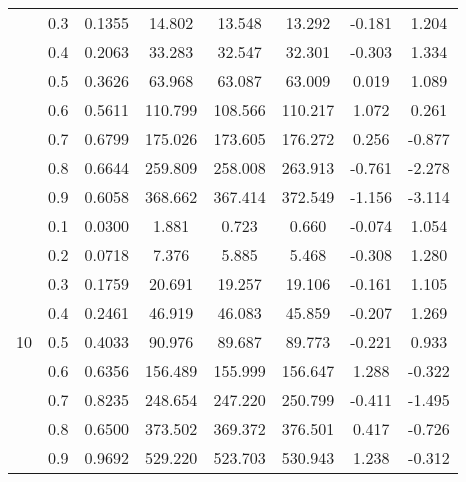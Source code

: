 \documentclass[11pt,a4paper]{report}
\begin{document}
\begin{longtable}{ | c | c || c | c | c | c | c | c | }
 & 0.3 & 0.1355 & 14.802 & 13.548 & 13.292 & -0.181 & 1.204 \\
 & 0.4 & 0.2063 & 33.283 & 32.547 & 32.301 & -0.303 & 1.334 \\
 & 0.5 & 0.3626 & 63.968 & 63.087 & 63.009 & 0.019 & 1.089 \\
 & 0.6 & 0.5611 & 110.799 & 108.566 & 110.217 & 1.072 & 0.261 \\
 & 0.7 & 0.6799 & 175.026 & 173.605 & 176.272 & 0.256 & -0.877 \\
 & 0.8 & 0.6644 & 259.809 & 258.008 & 263.913 & -0.761 & -2.278 \\
 & 0.9 & 0.6058 & 368.662 & 367.414 & 372.549 & -1.156 & -3.114 \\
 \hline
\multirow{9}{*}{10} & 0.1 & 0.0300 & 1.881 & 0.723 & 0.660 & -0.074 & 1.054 \\
 & 0.2 & 0.0718 & 7.376 & 5.885 & 5.468 & -0.308 & 1.280 \\
 & 0.3 & 0.1759 & 20.691 & 19.257 & 19.106 & -0.161 & 1.105 \\
 & 0.4 & 0.2461 & 46.919 & 46.083 & 45.859 & -0.207 & 1.269 \\
 & 0.5 & 0.4033 & 90.976 & 89.687 & 89.773 & -0.221 & 0.933 \\
 & 0.6 & 0.6356 & 156.489 & 155.999 & 156.647 & 1.288 & -0.322 \\
 & 0.7 & 0.8235 & 248.654 & 247.220 & 250.799 & -0.411 & -1.495 \\
 & 0.8 & 0.6500 & 373.502 & 369.372 & 376.501 & 0.417 & -0.726 \\
 & 0.9 & 0.9692 & 529.220 & 523.703 & 530.943 & 1.238 & -0.312 \\
 \hline
\hline
\end{longtable}
\end{document}
